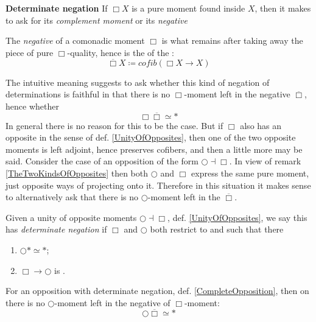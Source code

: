 \textbf{Determinate negation}
If $\Box X$ is a pure moment found inside $X$, then it makes to ask for its \emph{complement moment} or its \emph{negative}
\begin{defn}
\label{NegativeMoment}\hypertarget{NegativeMoment}{}
The \emph{negative} of a comonadic moment $\Box$ is what remains after taking away the piece of pure $\Box$-quality, hence is the  of the :
\begin{displaymath}
\overline{\Box} X \coloneqq cofib(\Box X \to X)
\end{displaymath}
\end{defn}
The intuitive meaning suggests to ask whether this kind of negation of determinations is faithful in that there is no $\Box$-moment left in the negative $\overline{\Box}$, hence whether
\begin{displaymath}
\Box \overline{\Box} \simeq \ast
\end{displaymath}
In general there is no reason for this to be the case. But if $\Box$ also has an opposite in the sense of def. \ref{UnityOfOpposites}, then one of the two opposite moments is left adjoint, hence preserves cofibers, and then a little more may be said.
Consider the case of an opposition of the form $\bigcirc \dashv \Box$. In view of remark \ref{TheTwoKindsOfOpposites} then both $\bigcirc$ and $\Box$ express the same pure moment, just opposite ways of projecting onto it. Therefore in this situation it makes sense to alternatively ask that there is no $\bigcirc$-moment left in the $\overline{\Box}$.
\begin{defn}
\label{CompleteOpposition}\hypertarget{CompleteOpposition}{}
Given a unity of opposite moments $\bigcirc \dashv \Box$, def. \ref{UnityOfOpposites}, we say this has \emph{determinate negation} if $\Box$ and $\bigcirc$ both restrict to  and such that there
\begin{enumerate}%
\item $\bigcirc \ast \simeq \ast$;
\item $\Box  \longrightarrow \bigcirc$ is .
\end{enumerate}
\end{defn}
\begin{prop}
\label{AccuracyOfNegatives}\hypertarget{AccuracyOfNegatives}{}
For an opposition with determinate negation, def. \ref{CompleteOpposition}, then on  there is no $\bigcirc$-moment left in the negative of $\Box$-moment:
\begin{displaymath}
\bigcirc \overline{\Box} \simeq \ast
\end{displaymath}
\end{prop}
